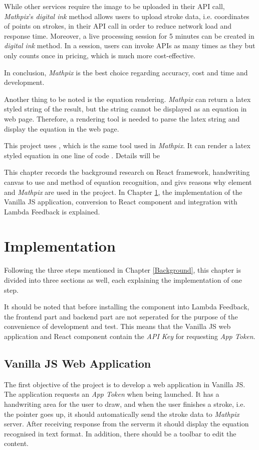 \documentclass[12pt,twoside]{report}
\begin{document}
While other services require the image to be uploaded in their API call,
\textit{Mathpix}'s \textit{digital ink} method allows users to upload stroke
data, i.e. coordinates of points on strokes, in their API call in order to
reduce network load and response time. Moreover, a live processing session for 5
minutes can be created in \textit{digital ink} method. In a session, users can
invoke APIs as many times as they but only counts once in pricing, which is much
more cost-effective.

In conclusion, \textit{Mathpix} is the best choice regarding accuracy, cost and time and development.

Another thing to be noted is the equation rendering. \textit{Mathpix} can return a latex styled string of the result, but the string cannot be displayed as an equation in web page. Therefore, a rendering tool is needed to parse the latex string and display the equation in the web page. 

This project uses , which is the same tool used in \textit{Mathpix}. It can render a latex styled equation in one line of code \cite{web:katexapi}. Details will be 

This chapter records the background research on React framework, handwriting canvas to use and method of equation recognition, and givs reasons why  element and \textit{Mathpix} are used in the project. In Chapter \ref{Implementation}, the implementation of the Vanilla JS application, conversion to React component and integration with Lambda Feedback is explained.



\chapter{Implementation}
\label{Implementation}

Following the three steps mentioned in Chapter \ref{Background}, this chapter is divided into three sections as well, each explaining the implementation of one step.

It should be noted that before installing the component into Lambda Feedback, the frontend part and backend part are not seperated for the purpose of the convenience of development and test. This means that the Vanilla JS web application and React component contain the \textit{API Key} for requesting \textit{App Token}.

\section{Vanilla JS Web Application}
The first objective of the project is to develop a web application in Vanilla JS. The application
requests an \textit{App Token} when being launched. It has a handwriting area
for the user to draw, and when the user finishes a stroke, i.e. the pointer goes
up, it should automatically send the stroke data to \textit{Mathpix} server.
After receiving response from the serverm it should display the equation
recognised in text format. In addition, there should be a toolbar to edit the
content. 
\end{document}

